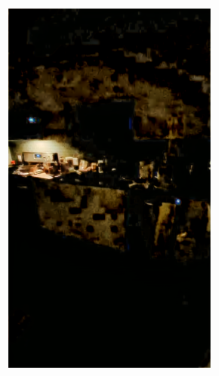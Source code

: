 \documentclass[letterpaper,12pt]{article}
\begin{document}
\begin{figure}[htbp]
\begin{subfigure}{0.128\textwidth}
			\includegraphics[width=\linewidth]{LoLi-Phone-imgT/DRBN}
			\captionsetup{font=scriptsize}
			\caption{}
			\label{fig: LoLi-Phone-imgT_k}  
		\end{subfigure}    
		\begin{subfigure}{0.128\textwidth}

\end{subfigure}
\end{figure}
\end{document}
